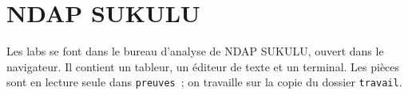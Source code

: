 \section*{NDAP SUKULU}

Les labs se font dans le bureau d'analyse de NDAP SUKULU, ouvert dans le
navigateur. Il contient un tableur, un éditeur de texte et un terminal.
Les pièces sont en lecture seule dans \texttt{preuves}~; on travaille sur
la copie du dossier \texttt{travail}.

